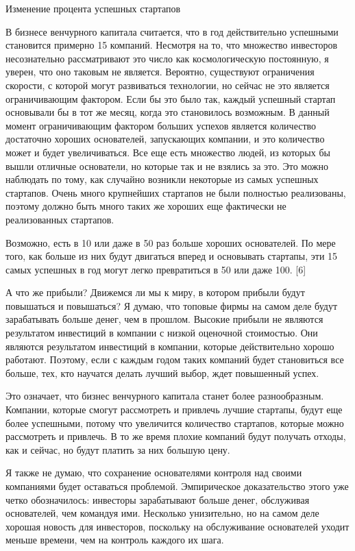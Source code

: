 \documentclass[ebook,12pt,oneside,openany]{memoir}
\begin{document}
Изменение процента успешных стартапов

В бизнесе венчурного капитала считается, что в год действительно
успешными становится примерно 15 компаний. Несмотря на то, что
множество инвесторов несознательно рассматривают это число как
космологическую постоянную, я уверен, что оно таковым не является.
Вероятно, существуют ограничения скорости, с которой могут развиваться
технологии, но сейчас не это является ограничивающим фактором. Если бы
это было так, каждый успешный стартап основывали бы в тот же месяц,
когда это становилось возможным. В данный момент ограничивающим
фактором больших успехов является количество достаточно хороших
основателей, запускающих компании, и это количество может и будет
увеличиваться. Все еще есть множество людей, из которых бы вышли
отличные основатели, но которые так и не взялись за это. Это можно
наблюдать по тому, как случайно возникли некоторые из самых успешных
стартапов. Очень много крупнейших стартапов не были полностью
реализованы, поэтому должно быть много таких же хороших еще фактически
не реализованных стартапов.

Возможно, есть в 10 или даже в 50 раз больше хороших основателей. По
мере того, как больше из них будут двигаться вперед и основывать
стартапы, эти 15 самых успешных в год могут легко превратиться в 50
или даже 100. [6]

А что же прибыли? Движемся ли мы к миру, в котором прибыли будут
повышаться и повышаться? Я думаю, что топовые фирмы на самом деле
будут зарабатывать больше денег, чем в прошлом. Высокие прибыли не
являются результатом инвестиций в компании с низкой оценочной
стоимостью. Они являются результатом инвестиций в компании, которые
действительно хорошо работают. Поэтому, если с каждым годом таких
компаний будет становиться все больше, тех, кто научатся делать лучший
выбор, ждет повышенный успех.

Это означает, что бизнес венчурного капитала станет более
разнообразным. Компании, которые смогут рассмотреть и привлечь лучшие
стартапы, будут еще более успешными, потому что увеличится количество
стартапов, которые можно рассмотреть и привлечь. В то же время плохие
компаний будут получать отходы, как и сейчас, но будут платить за них
большую цену.

Я также не думаю, что сохранение основателями контроля над своими
компаниями будет оставаться проблемой. Эмпирическое доказательство
этого уже четко обозначилось: инвесторы зарабатывают больше денег,
обслуживая основателей, чем командуя ими. Несколько унизительно, но на
самом деле хорошая новость для инвесторов, поскольку на обслуживание
основателей уходит меньше времени, чем на контроль каждого их шага.
\end{document}
